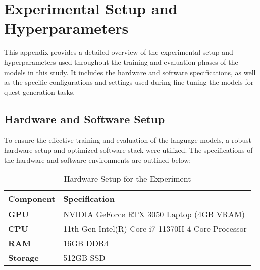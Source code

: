\chapter{Experimental Setup and Hyperparameters}
\label{appendix:experimental-setup}

This appendix provides a detailed overview of the experimental setup and hyperparameters
used throughout the training and evaluation phases of the models in this study. It
includes the hardware and software specifications, as well as the specific configurations
and settings used during fine-tuning the models for quest generation tasks.

\section*{Hardware and Software Setup}

To ensure the effective training and evaluation of the language models, a robust hardware
setup and optimized software stack were utilized. The specifications of the hardware and
software environments are outlined below:

\begin{table}[H]
  \centering
  \scriptsize
  \renewcommand{\arraystretch}{1.3}
  \begin{tabularx}{0.95\textwidth}{
    >{\raggedright\arraybackslash}p{5cm}
    >{\centering\arraybackslash}X
  }
    \toprule
    \textbf{Component} & \textbf{Specification} \\
    \midrule
    \textbf{GPU} & NVIDIA GeForce RTX 3050 Laptop (4GB VRAM) \\
    \textbf{CPU} & 11th Gen Intel(R) Core i7-11370H 4-Core Processor \\
    \textbf{RAM} & 16GB DDR4 \\
    \textbf{Storage} & 512GB SSD \\
    \bottomrule
  \end{tabularx}
  \caption{Hardware Setup for the Experiment}
\end{table}

